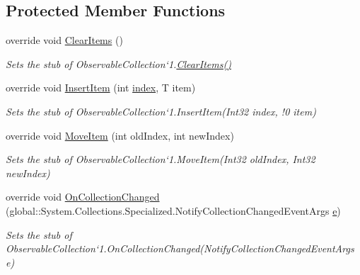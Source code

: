 \subsection*{Protected Member Functions}
\begin{DoxyCompactItemize}
\item 
override void \hyperlink{class_system_1_1_collections_1_1_object_model_1_1_fakes_1_1_stub_observable_collection_3_01_t_01_4_a09bb744b299385dd15380cd3cc73af2d}{Clear\-Items} ()
\begin{DoxyCompactList}\small\item\em Sets the stub of Observable\-Collection`1.\hyperlink{class_system_1_1_collections_1_1_object_model_1_1_fakes_1_1_stub_observable_collection_3_01_t_01_4_a09bb744b299385dd15380cd3cc73af2d}{Clear\-Items()}\end{DoxyCompactList}\item 
override void \hyperlink{class_system_1_1_collections_1_1_object_model_1_1_fakes_1_1_stub_observable_collection_3_01_t_01_4_a1f191af99251fb5283608e2cb3e27a0a}{Insert\-Item} (int \hyperlink{jquery-1_810_82-vsdoc_8js_a75bb12d1f23302a9eea93a6d89d0193e}{index}, T item)
\begin{DoxyCompactList}\small\item\em Sets the stub of Observable\-Collection`1.Insert\-Item(Int32 index, !0 item)\end{DoxyCompactList}\item 
override void \hyperlink{class_system_1_1_collections_1_1_object_model_1_1_fakes_1_1_stub_observable_collection_3_01_t_01_4_a9a9997ae17c56e43ed96a76e3d1ddd06}{Move\-Item} (int old\-Index, int new\-Index)
\begin{DoxyCompactList}\small\item\em Sets the stub of Observable\-Collection`1.Move\-Item(\-Int32 old\-Index, Int32 new\-Index)\end{DoxyCompactList}\item 
override void \hyperlink{class_system_1_1_collections_1_1_object_model_1_1_fakes_1_1_stub_observable_collection_3_01_t_01_4_a431969efd014e34e74760349b6686d3d}{On\-Collection\-Changed} (global\-::\-System.\-Collections.\-Specialized.\-Notify\-Collection\-Changed\-Event\-Args \hyperlink{jquery-1_810_82_8min_8js_a2c038346d47955cbe2cb91e338edd7e1}{e})
\begin{DoxyCompactList}\small\item\em Sets the stub of Observable\-Collection`1.On\-Collection\-Changed(\-Notify\-Collection\-Changed\-Event\-Args e)\end{DoxyCompactList}\item 

\end{DoxyCompactItemize}

